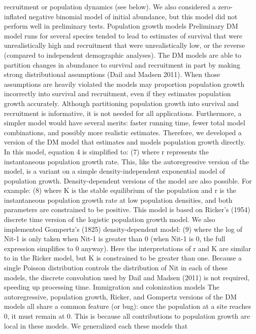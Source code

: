 \documentclass[12pt]{article}
\begin{document}
recruitment or population dynamics (see below).
We also considered a zero-inflated negative binomial model of initial
abundance, but this model did not perform well in preliminary tests.
Population growth models
Preliminary DM model runs for several species tended to lead to
estimates of survival that were unrealistically high and recruitment
that were unrealistically low, or the reverse (compared to independent
demographic analyses).  The DM models are able to partition changes in
abundance to survival and recruitment in part by making strong
distributional assumptions (Dail and Madsen 2011).  When those
assumptions are heavily violated the models may proportion population
growth incorrectly into survival and recruitment, even if they
estimates population growth accurately.
Although partitioning population growth into survival and recruitment
is informative, it is not needed for all applications.  Furthermore, a
simpler model would have several merits: faster running time, fewer
total model combinations, and possibly more realistic estimates.
Therefore, we developed a version of the DM model that estimates and
models population growth directly.  In this model, equation 4 is
simplified to:
(7)
where r represents the instantaneous population growth rate.  This,
like the autoregressive version of the model, is a variant on a simple
density-independent exponential model of population growth.
Density-dependent versions of the model are also possible.  For
example:
(8)
where K is the stable equilibrium of the population and r is the
instantaneous population growth rate at low population densities, and
both parameters are constrained to be positive.  This model is based
on Ricker's (1954) discrete time version of the logistic population
growth model.  We also implemented Gompertz's (1825) density-dependent
model:
(9)
where the log of Nit-1 is only taken when Nit-1 is greater than 0
(when Nit-1 is 0, the full expression simplifies to 0 anyway).  Here
the interpretations of r and K are similar to in the Ricker model, but
K is constrained to be greater than one.
Because a single Poisson distribution controls the
distribution of Nit in each of these models, the discrete
convolution used by Dail and Madsen (2011) is not required,
speeding up processing time.
Immigration and colonization models
The autoregressive, population growth, Ricker, and Gompertz
versions of the DM models all share a common feature (or bug):
once the population at a site reaches 0, it must remain at 0.
This is because all contributions to population growth are
local in these models.  We generalized each these models that
\end{document}

